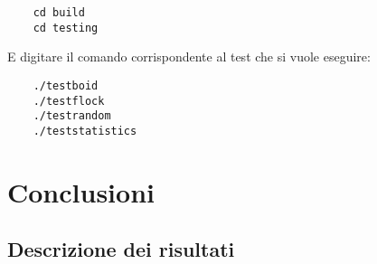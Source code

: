 \documentclass[10pt,a4paper]{article}
\begin{document}
\begin{lstlisting}
    cd build
    cd testing
\end{lstlisting}

E digitare il comando corrispondente al test che si vuole eseguire: 

\begin{lstlisting}
    ./testboid
    ./testflock
    ./testrandom
    ./teststatistics
\end{lstlisting}

\section{Conclusioni}

\subsection{Descrizione dei risultati}
\end{document}
